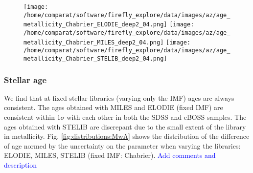 \documentclass[onecolumn]{aa}
\begin{document}
\begin{figure}
\begin{center}
\texttt{[image: /home/comparat/software/firefly\_explore/data/images/az/age\_metallicity\_Chabrier\_ELODIE\_deep2\_04.png]}
\hspace*{-1.7cm}
\texttt{[image: /home/comparat/software/firefly\_explore/data/images/az/age\_metallicity\_Chabrier\_MILES\_deep2\_04.png]}
\hspace*{-1.7cm}
\texttt{[image: /home/comparat/software/firefly\_explore/data/images/az/age\_metallicity\_Chabrier\_STELIB\_deep2\_04.png]}
\end{center}
\end{figure}
% 


\subsubsection{Stellar age}
\label{subsec:res:age}

We find that at fixed stellar libraries (varying only the IMF) ages are always consistent. 
The ages obtained with MILES and ELODIE (fixed IMF) are consistent within $1\sigma$ with each other in both the SDSS and eBOSS samples.
The ages obtained with STELIB are discrepant due to the small extent of the library in metallicity. 
Fig. \ref{fig:distributions:MwA} shows the distribution of the difference of age normed by the uncertainty on the parameter when varying the libraries: ELODIE, MILES, STELIB (fixed IMF: Chabrier).
\textcolor{blue}{Add comments and description}
\end{document}
